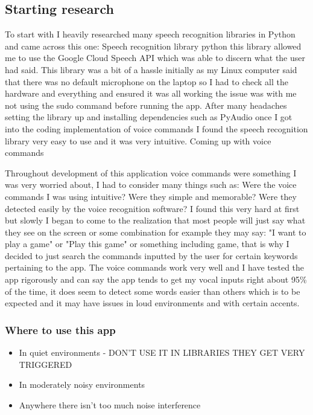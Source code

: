 \documentclass{article}
\begin{document}
\subsection{Starting research}
To start with I heavily researched many speech recognition libraries in Python and came across this one: Speech recognition library python this library allowed me to use the Google Cloud Speech API which was able to discern what the user had said.
This library was a bit of a hassle initially as my Linux computer said that there was no default microphone on the laptop so I had to check all the hardware and everything and ensured it was all working the issue was with me not using the sudo command before running the app. After many headaches setting the library up and installing dependencies such as PyAudio once I got into the coding implementation of voice commands I found the speech recognition library very easy to use and it was very intuitive.
Coming up with voice commands

Throughout development of this application voice commands were something I was very worried about, I had to consider many things such as: Were the voice commands I was using intuitive? Were they simple and memorable? Were they detected easily by the voice recognition software? I found this very hard at first but slowly I began to come to the realization that most people will just say what they see on the screen or some combination for example they may say: "I want to play a game" or "Play this game" or something including game, that is why I decided to just search the commands inputted by the user for certain keywords pertaining to the app. The voice commands work very well and I have tested the app rigorously and can say the app tends to get my vocal inputs right about 95\% of the time, it does seem to detect some words easier than others which is to be expected and it may have issues in loud environments and with certain accents.

\subsubsection{Where to use this app}
\begin{itemize}
    \item In quiet environments - DON'T USE IT IN LIBRARIES THEY GET VERY TRIGGERED
    \item In moderately noisy environments
    \item Anywhere there isn't too much noise interference
\end{itemize}
\end{document}
